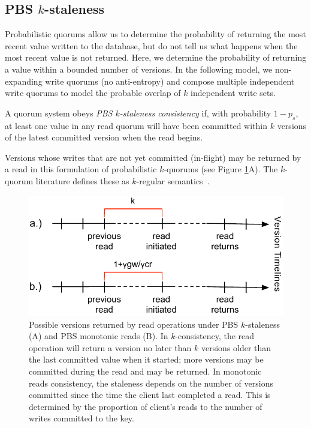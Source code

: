 \documentclass{vldb}
\begin{document}
\subsection{PBS $k$-staleness}

Probabilistic quorums allow us to determine the probability of
returning the most recent value written to the database, but do not
tell us what happens when the most recent value is not returned.
Here, we determine the probability of returning a value within a
bounded number of versions.  In the following model, we non-expanding 
write quorums (no anti-entropy) and compose multiple independent write
quorums to model the probable overlap of $k$ independent write sets.
\begin{definition}
A quorum system obeys \textit{PBS $k$-staleness consistency} if, with
probability $1-p_{s}$, at least one value in any read quorum will
have been committed within $k$ versions of the latest committed
version when the read begins.
\end{definition}
Versions whose writes that are not yet committed (in-flight) may be
returned by a read in this formulation of probabilistic $k$-quorums
(see Figure \ref{fig:timelines}A).  The $k$-quorum literature defines
these as $k$-regular semantics~\cite{non-strict}.

\begin{figure}
\centering
\includegraphics[width=\columnwidth]{figs/timelines.pdf}
\vspace{-16pt}
\caption{Possible versions returned by read operations under
  PBS $k$-staleness (A) and PBS monotonic reads (B). In
  $k$-consistency, the read operation will return a version no later
  than $k$ versions older than the last committed value when it
  started; more versions may be committed during the read and may be
  returned.  In monotonic reads consistency, the staleness depends on
  the number of versions committed since the time the client last
  completed a read.  This is determined by the proportion of client's
  reads to the number of writes committed to the key.}
\vspace{-12pt}
\label{fig:timelines}
\end{figure}
\end{document}
